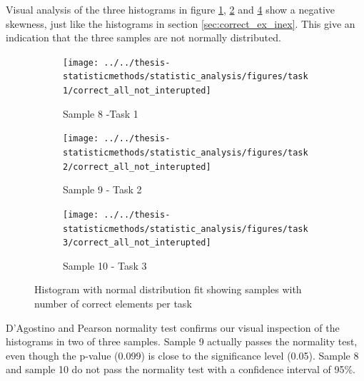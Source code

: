   Visual analysis of the three histograms in figure \ref{fig:correctallnotinterupted_task1}, \ref{fig:correctallnotinterupted_task2} and \ref{fig:correctallnotinterupted_task3} show a negative skewness, just like the histograms in section \ref{sec:correct_ex_inex}. This give an indication that the three samples are not normally distributed. 
 
 \begin{figure}[H]
 	\centering
	 \begin{subfigure}[b]{0.3\textwidth}
	 	\centering
	 	\texttt{[image: ../../thesis-statisticmethods/statistic\_analysis/figures/task1/correct\_all\_not\_interupted]}
	 	\caption{Sample 8 -Task 1}
	 	\label{fig:correctallnotinterupted_task1}
	 \end{subfigure}
	\begin{subfigure}[b]{0.3\textwidth}
		\centering
		\texttt{[image: ../../thesis-statisticmethods/statistic\_analysis/figures/task2/correct\_all\_not\_interupted]}
		\caption{Sample 9 - Task 2}
		\label{fig:correctallnotinterupted_task2}
	\end{subfigure}
	 \begin{subfigure}[b]{0.3\textwidth}
	 	\centering
	 	\texttt{[image: ../../thesis-statisticmethods/statistic\_analysis/figures/task3/correct\_all\_not\_interupted]}
	 	\caption{Sample 10 - Task 3}
	 	\label{fig:correctallnotinterupted_task3}
	 \end{subfigure}
 \caption{Histogram with normal distribution fit showing samples with number of correct elements per task}
 \end{figure}
 
 D'Agostino and Pearson normality test confirms our visual inspection of the histograms in two of three samples. Sample 9 actually passes the normality test, even though the p-value (0.099) is close to the significance level (0.05). Sample 8 and sample 10 do not pass the normality test with a confidence interval of 95\%. 
 
